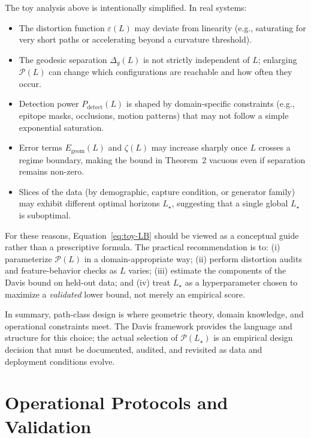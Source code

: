 \documentclass[11pt]{article}
\begin{document}
The toy analysis above is intentionally simplified. In real systems:

\begin{itemize}[leftmargin=*]
  \item The distortion function $\varepsilon(L)$ may deviate from linearity (e.g., saturating for very
  short paths or accelerating beyond a curvature threshold).

  \item The geodesic separation $\Delta_g(L)$ is not strictly independent of $L$; enlarging
  $\mathcal{P}(L)$ can change which configurations are reachable and how often they occur.

  \item Detection power $P_{\mathrm{detect}}(L)$ is shaped by domain-specific constraints (e.g.,
  epitope masks, occlusions, motion patterns) that may not follow a simple exponential saturation.

  \item Error terms $E_{\mathrm{geom}}(L)$ and $\zeta(L)$ may increase sharply once $L$ crosses a
  regime boundary, making the bound in Theorem~2 vacuous even if separation remains non-zero.

  \item Slices of the data (by demographic, capture condition, or generator family) may exhibit
  different optimal horizons $L_\star$, suggesting that a single global $L_\star$ is suboptimal.
\end{itemize}

For these reasons, Equation~\eqref{eq:toy-LB} should be viewed as a conceptual guide rather than a
prescriptive formula. The practical recommendation is to: (i) parameterize $\mathcal{P}(L)$ in a
domain-appropriate way; (ii) perform distortion audits and feature-behavior checks as $L$ varies;
(iii) estimate the components of the Davis bound on held-out data; and (iv) treat $L_\star$ as a
hyperparameter chosen to maximize a \emph{validated} lower bound, not merely an empirical score.

In summary, path-class design is where geometric theory, domain knowledge, and operational
constraints meet. The Davis framework provides the language and structure for this choice; the
actual selection of $\mathcal{P}(L_\star)$ is an empirical design decision that must be documented,
audited, and revisited as data and deployment conditions evolve.

\section{Operational Protocols and Validation}
\label{sec:ops}
\label{sec:ops-protocols}
\end{document}
